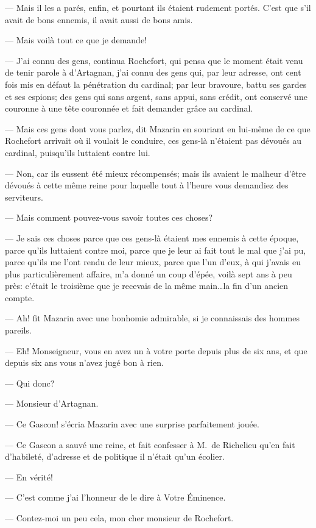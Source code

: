 — Mais il les a parés, enfin, et pourtant ils étaient rudement portés. C'est que s'il avait de bons ennemis, il avait aussi de bons amis.

— Mais voilà tout ce que je demande!

— J'ai connu des gens, continua Rochefort, qui pensa que le moment était venu de tenir parole à d'Artagnan, j'ai connu des gens qui, par leur adresse, ont cent fois mis en défaut la pénétration du cardinal; par leur bravoure, battu ses gardes et ses espions; des gens qui sans argent, sans appui, sans crédit, ont conservé une couronne à une tête couronnée et fait demander grâce au cardinal.

— Mais ces gens dont vous parlez, dit Mazarin en souriant en lui-même de ce que Rochefort arrivait où il voulait le conduire, ces gens-là n'étaient pas dévoués au cardinal, puisqu'ils luttaient contre lui.

— Non, car ils eussent été mieux récompensés; mais ils avaient le malheur d'être dévoués à cette même reine pour laquelle tout à l'heure vous demandiez des serviteurs.

— Mais comment pouvez-vous savoir toutes ces choses?

— Je sais ces choses parce que ces gens-là étaient mes ennemis à cette époque, parce qu'ils luttaient contre moi, parce que je leur ai fait tout le mal que j'ai pu, parce qu'ils me l'ont rendu de leur mieux, parce que l'un d'eux, à qui j'avais eu plus particulièrement affaire, m'a donné un coup d'épée, voilà sept ans à peu près: c'était le troisième que je recevais de la même main\dots la fin d'un ancien compte.

— Ah! fit Mazarin avec une bonhomie admirable, si je connaissais des hommes pareils.

— Eh! Monseigneur, vous en avez un à votre porte depuis plus de six ans, et que depuis six ans vous n'avez jugé bon à rien.

— Qui donc?

— Monsieur d'Artagnan.

— Ce Gascon! s'écria Mazarin avec une surprise parfaitement jouée.

— Ce Gascon a sauvé une reine, et fait confesser à M.~de Richelieu qu'en fait d'habileté, d'adresse et de politique il n'était qu'un écolier.

— En vérité!

— C'est comme j'ai l'honneur de le dire à Votre Éminence.

— Contez-moi un peu cela, mon cher monsieur de Rochefort.

